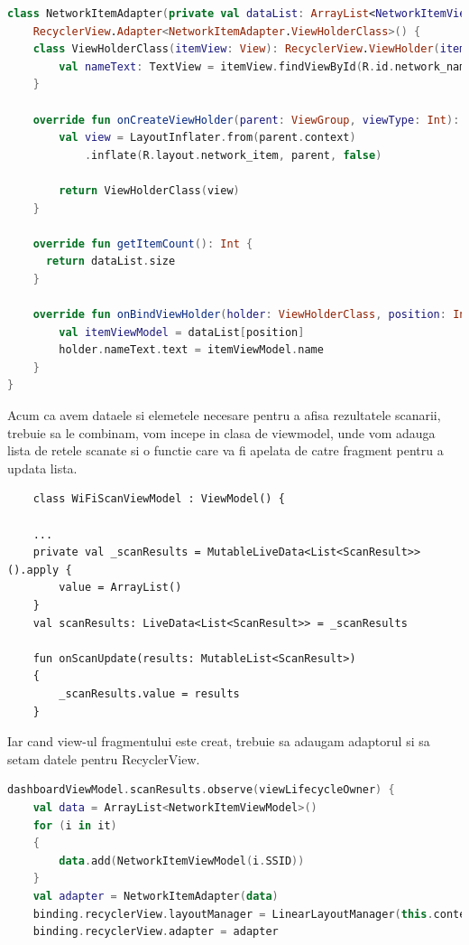 \begin{lstlisting}[language=Kotlin]
class NetworkItemAdapter(private val dataList: ArrayList<NetworkItemViewModel>):
    RecyclerView.Adapter<NetworkItemAdapter.ViewHolderClass>() {
    class ViewHolderClass(itemView: View): RecyclerView.ViewHolder(itemView) {
        val nameText: TextView = itemView.findViewById(R.id.network_name)
    }

    override fun onCreateViewHolder(parent: ViewGroup, viewType: Int): ViewHolderClass {
        val view = LayoutInflater.from(parent.context)
            .inflate(R.layout.network_item, parent, false)

        return ViewHolderClass(view)
    }

    override fun getItemCount(): Int {
      return dataList.size
    }

    override fun onBindViewHolder(holder: ViewHolderClass, position: Int) {
        val itemViewModel = dataList[position]
        holder.nameText.text = itemViewModel.name
    }
}
\end{lstlisting}

Acum ca avem dataele si elemetele necesare pentru a afisa rezultatele scanarii, trebuie sa le combinam, vom incepe in clasa de viewmodel, unde vom
adauga lista de retele scanate si o functie care va fi apelata de catre fragment pentru a updata lista.
\begin{lstlisting}
    class WiFiScanViewModel : ViewModel() {

    ...
    private val _scanResults = MutableLiveData<List<ScanResult>>().apply {
        value = ArrayList()
    }
    val scanResults: LiveData<List<ScanResult>> = _scanResults

    fun onScanUpdate(results: MutableList<ScanResult>)
    {
        _scanResults.value = results
    }

\end{lstlisting}

Iar cand view-ul fragmentului este creat, trebuie sa adaugam adaptorul si sa setam datele pentru RecyclerView.
\begin{lstlisting}[language=Kotlin]
    dashboardViewModel.scanResults.observe(viewLifecycleOwner) {
    val data = ArrayList<NetworkItemViewModel>()
    for (i in it)
    {
        data.add(NetworkItemViewModel(i.SSID))
    }
    val adapter = NetworkItemAdapter(data)
    binding.recyclerView.layoutManager = LinearLayoutManager(this.context)
    binding.recyclerView.adapter = adapter
\end{lstlisting}

